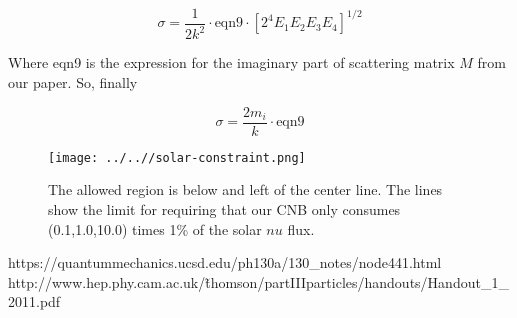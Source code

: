 \documentclass[reprint,onecolumn,superscriptaddress,preprintnumbers]{revtex4}%
\begin{document}
\begin{equation}
\sigma=\frac{1}{2k^2} \cdot \mathrm{eqn9} \cdot [2^4E_1E_2E_3E_4]^{1/2}
\end{equation}

Where eqn9 is the expression for the imaginary part of scattering matrix $M$ from our paper. So, finally

\begin{equation}
\sigma=\frac{2m_i}{k} \cdot \mathrm{eqn9}
\end{equation}


\begin{figure}[h]
\begin{centering}
\texttt{[image: ../..//solar-constraint.png]}
\caption{The allowed region is below and left of the center line. The lines show the limit for requiring that our CNB only consumes (0.1,1.0,10.0) times 1\% of the solar $nu$ flux.}
\end{centering}
\end{figure}


 

   
\begin{thebibliography}{9}
 https://quantummechanics.ucsd.edu/ph130a/130\_notes/node441.html
 http://www.hep.phy.cam.ac.uk/\~thomson/partIIIparticles/handouts/Handout\_1\_2011.pdf  
\end{thebibliography}
\end{document}
